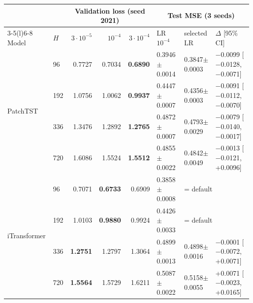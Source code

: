{\setlength{\tabcolsep}{4pt}%
\begin{tabular}{@{}llrrrlll@{}}
\toprule
 & & \multicolumn{3}{c}{Validation loss (seed 2021)} & \multicolumn{3}{c}{Test MSE (3 seeds)} \\
\cmidrule(lr){3-5}\cmidrule(l){6-8}
Model & $H$ & $3{\cdot}10^{-5}$ & $10^{-4}$ & $3{\cdot}10^{-4}$ & LR $10^{-4}$ & selected LR & $\Delta$ [95\% CI] \\
\midrule
\multirow{4}{*}{PatchTST} & 96 & 0.7727 & 0.7034 & \textbf{0.6890} & 0.3946$\pm$0.0014 & 0.3847$\pm$0.0003 & $-$0.0099 [$-$0.0128, $-$0.0071] \\
 & 192 & 1.0756 & 1.0062 & \textbf{0.9937} & 0.4447$\pm$0.0007 & 0.4356$\pm$0.0003 & $-$0.0091 [$-$0.0112, $-$0.0070] \\
 & 336 & 1.3476 & 1.2892 & \textbf{1.2765} & 0.4872$\pm$0.0007 & 0.4793$\pm$0.0029 & $-$0.0079 [$-$0.0140, $-$0.0017] \\
 & 720 & 1.6086 & 1.5524 & \textbf{1.5512} & 0.4855$\pm$0.0022 & 0.4842$\pm$0.0049 & $-$0.0013 [$-$0.0121, +0.0096] \\
\midrule
\multirow{4}{*}{iTransformer} & 96 & 0.7071 & \textbf{0.6733} & 0.6909 & 0.3858$\pm$0.0008 & \multicolumn{2}{l}{= default} \\
 & 192 & 1.0103 & \textbf{0.9880} & 0.9924 & 0.4426$\pm$0.0033 & \multicolumn{2}{l}{= default} \\
 & 336 & \textbf{1.2751} & 1.2797 & 1.3064 & 0.4899$\pm$0.0013 & 0.4898$\pm$0.0016 & $-$0.0001 [$-$0.0072, +0.0071] \\
 & 720 & \textbf{1.5564} & 1.5729 & 1.6211 & 0.5087$\pm$0.0022 & 0.5158$\pm$0.0055 & +0.0071 [$-$0.0023, +0.0165] \\
\bottomrule
\end{tabular}%
}
